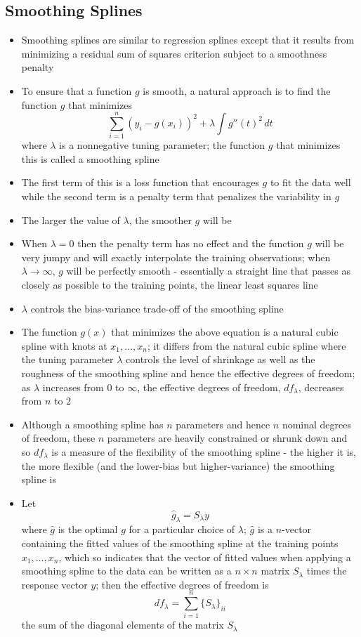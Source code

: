 \documentclass[12pt]{article}
\begin{document}
\subsection{Smoothing Splines}
\begin{itemize}
\item Smoothing splines are similar to regression splines except that it results from minimizing a residual sum of squares criterion subject to a smoothness penalty
\item To ensure that a function $g$ is smooth, a natural approach is to find the function $g$ that minimizes $$ \sum_{i=1}^n (y_i - g(x_i))^2 + \lambda\int g''(t)^2 \, dt $$ where $\lambda$ is a nonnegative tuning parameter; the function $g$ that minimizes this is called a smoothing spline 
\item The first term of this is a loss function that encourages $g$ to fit the data well while the second term is a penalty term that penalizes the variability in $g$ 
\item The larger the value of $\lambda$, the smoother $g$ will be 
\item When $\lambda = 0$ then the penalty term has no effect and the function $g$ will be very jumpy and will exactly interpolate the training observations; when $\lambda \to \infty$, $g$ will be perfectly smooth - essentially a straight line that passes as closely as possible to the training points, the linear least squares line 
\item $\lambda$ controls the bias-variance trade-off of the smoothing spline 
\item The function $g(x)$ that minimizes the above equation is a natural cubic spline with knots at $x_1,\dots,x_n$; it differs from the natural cubic spline where the tuning parameter $\lambda$ controls the level of shrinkage as well as the roughness of the smoothing spline and hence the effective degrees of freedom; as $\lambda$ increases from $0$ to $\infty$, the effective degrees of freedom, $df_{\lambda}$, decreases from $n$ to $2$
\item Although a smoothing spline has $n$ parameters and hence $n$ nominal degrees of freedom, these $n$ parameters are heavily constrained or shrunk down and so $df_\lambda$ is a measure of the flexibility of the smoothing spline - the higher it is, the more flexible (and the lower-bias but higher-variance) the smoothing spline is
\item Let $$ \hat{g}_\lambda = S_\lambda y$$ where $\hat{g}$ is the optimal $g$ for a particular choice of $\lambda$; $\hat{g}$ is a $n$-vector containing the fitted values of the smoothing spline at the training points $x_1,\dots,x_n$, which so indicates that the vector of fitted values when applying a smoothing spline to the data can be written as a $n \times n$ matrix $S_\lambda$ times the response vector $y$; then the effective degrees of freedom is $$ df_\lambda = \sum_{i=1}^n \{S_\lambda\}_{ii} $$ the sum of the diagonal elements of the matrix $S_\lambda$

\end{itemize}
\end{document}
